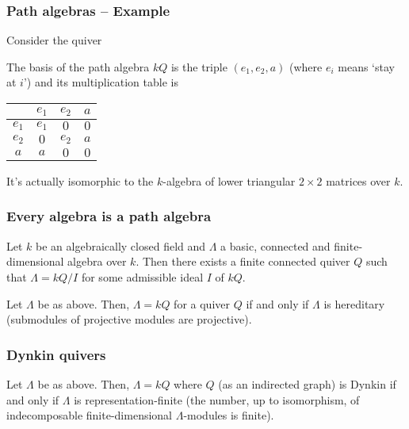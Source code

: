 \begin{frame}[fragile]
 \frametitle{Path algebras -- Example}
 Consider the quiver
 \begin{figure}[h]
  \centering
 \end{figure}

 \pause
 The basis of the path algebra $kQ$ is the triple $(e_1,e_2,a)$ (where $e_i$
 means `stay at $i$') and its multiplication table is
 \begin{table}[h]
  \centering
  \begin{tabular}{c|ccc}
   & $e_1$ & $e_2$ & $a$ \\
   \toprule
   $e_1$ & $e_1$ & $0$ & $0$\\
   $e_2$ & $0$ & $e_2$ & $a$\\
   $a$ & $a$ & $0$ & $0$
  \end{tabular}
 \end{table}

 \pause

 It's actually isomorphic to the $k$-algebra of lower triangular $2 \times 2$
 matrices over $k$.
\end{frame}

\begin{frame}
 \frametitle{Every algebra is a path algebra}
 \begin{theorem}
 	Let $k$ be an algebraically closed field and $\Lambda$ a basic, connected and
 	finite-dimensional algebra over $k$. Then there exists a finite connected
 	quiver $Q$ such that $\Lambda = kQ / I$ for some admissible ideal $I$ of $kQ$.
 \end{theorem}
 \pause
 \begin{theorem}
 	Let $\Lambda$ be as above. Then, $\Lambda = kQ$ for a quiver $Q$ if and only
 	if $\Lambda$ is \alert{hereditary} (submodules of projective modules are
 	projective).
 \end{theorem}
\end{frame}

\begin{frame}
 \frametitle{Dynkin quivers}
 \begin{theorem}[Gabriel's]
 	Let $\Lambda$ be as above. Then, $\Lambda = kQ$ where $Q$ (as an indirected
 	graph) is \alert{Dynkin} if and only if $\Lambda$ is
 	\alert{representation-finite} (the number, up to isomorphism, of
 	indecomposable finite-dimensional $\Lambda$-modules is finite).
 \end{theorem}
\end{frame}

